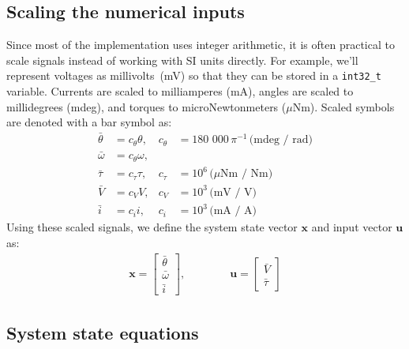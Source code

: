 \documentclass[12pt, a4paper]
{article}
\providecommand{\w}{\omega}
\renewcommand{\th}{\theta}
\providecommand{\w}{\omega}
\providecommand{\x}{\boldsymbol{x}}
\renewcommand{\u}{\boldsymbol{u}}
\begin{document}
\subsection{Scaling the numerical inputs}

Since most of the implementation uses integer arithmetic, it is often
practical to scale signals instead of working with SI units directly. For
example, we'll represent voltages as millivolts~(mV) so that they can be
stored in a \texttt{int32\_t} variable. Currents are scaled to milliamperes (mA),
angles are scaled to millidegrees (mdeg), and torques to
microNewtonmeters ($\mu$Nm). Scaled symbols are denoted with a bar symbol as:
%
\begin{align}
    \nonumber
    \bar{\th} &= c_\th \th,&  c_\th &= 180 \,\,000 \,\pi^{-1} \, \text{(mdeg / rad)}\\[1em]
    \nonumber
    \bar{\w} &= c_\th \w,&  &\\[1em]
    \label{eq:scaling}
    \bar{\tau} &= c_\tau \tau,&   c_\tau &= 10^6 \, \text{($\mu$Nm /  Nm)} \\[1em]
    \nonumber
    \bar{V} &= c_V V,&  c_V &= 10^3 \, \text{(mV / V)} \\[1em]
    \nonumber
    \bar{i} &= c_i i,&  c_i &= 10^3 \, \text{(mA / A)}
\end{align}
%
Using these scaled signals, we define the system state vector $\x$ and input
vector $\u$ as:
%
\begin{align}
    \label{eq:states}
    \x = \begin{bmatrix}
        \bar{\th}\\[1em]
        \bar{\w}\\[1em]
        \bar{i}
    \end{bmatrix},\qquad\qquad
    \u = \begin{bmatrix}
        \bar{V}\\[1em]
        \bar{\tau}
    \end{bmatrix}
\end{align}

\subsection{System state equations}
\end{document}
